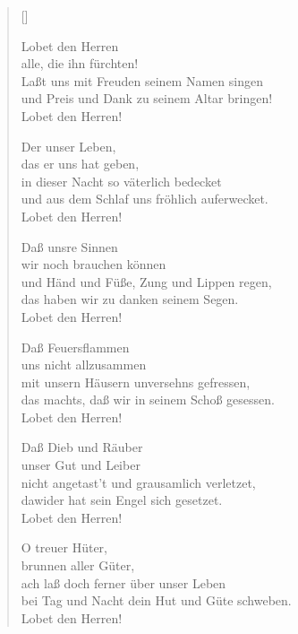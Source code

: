 \begin{multicols}{2}
\settowidth{\versewidth}{und Preis und Dank zu seinem Altar bringen!}
\begin{verse}[\versewidth]

 Lobet den Herren\\
alle, die ihn fürchten!\\
Laßt uns mit Freuden seinem Namen singen\\
und Preis und Dank zu seinem Altar bringen!\\
Lobet den Herren!

 Der unser Leben,\\
das er uns hat geben,\\
in dieser Nacht so väterlich bedecket\\
und aus dem Schlaf uns fröhlich auferwecket.\\
Lobet den Herren!

 Daß unsre Sinnen\\
wir noch brauchen können\\
und Händ und Füße, Zung und Lippen regen,\\
das haben wir zu danken seinem Segen.\\
Lobet den Herren!

 Daß Feuersflammen\\
uns nicht allzusammen\\
mit unsern Häusern unversehns gefressen,\\
das machts, daß wir in seinem Schoß gesessen.\\
Lobet den Herren!

 Daß Dieb und Räuber\\
unser Gut und Leiber\\
nicht angetast't und grausamlich verletzet,\\
dawider hat sein Engel sich gesetzet.\\
Lobet den Herren!

 O treuer Hüter,\\
brunnen aller Güter,\\
ach laß doch ferner über unser Leben\\
bei Tag und Nacht dein Hut und Güte schweben.\\
Lobet den Herren!


\end{verse}
\end{multicols}

